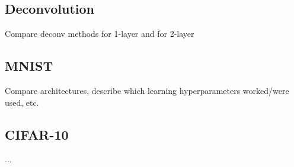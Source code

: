 \subsection{Deconvolution}
Compare deconv methods for 1-layer and for 2-layer


\subsection{MNIST}
Compare architectures, describe which learning hyperparameters worked/were used, etc.

\subsection{CIFAR-10}
...

\newpage